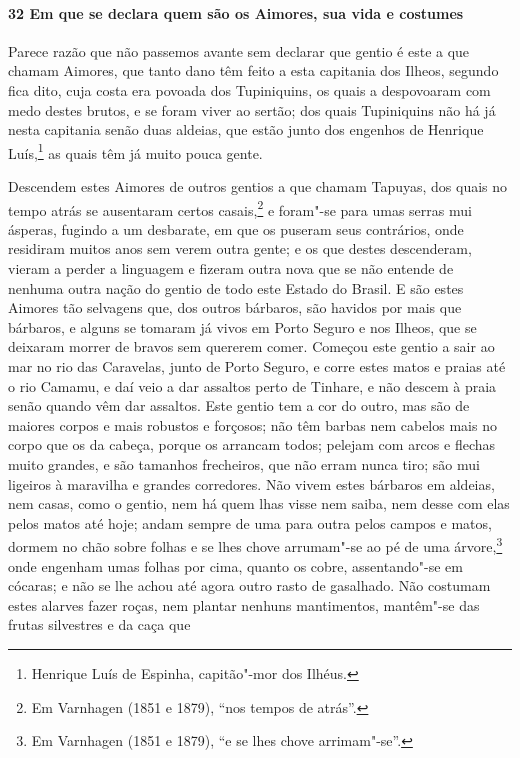 \begin{linenumbers}
\paragraph{32 Em que se declara quem são os Aimores, sua vida e costumes} \quad
Parece razão que não passemos avante sem declarar que gentio é este a que chamam Aimores,
que tanto dano têm feito a esta capitania dos Ilheos, segundo fica dito, cuja costa era
povoada dos Tupiniquins, os quais a despovoaram com medo destes brutos, e se foram viver
ao sertão; dos quais Tupiniquins não há já nesta capitania senão duas aldeias, que estão
junto dos engenhos de Henrique Luís,\footnote{ Henrique Luís de Espinha, capitão"-mor dos
Ilhéus.} as quais têm já muito pouca gente.

Descendem estes Aimores de outros gentios a que chamam Tapuyas, dos quais no tempo atrás
se ausentaram certos casais,\footnote{ Em Varnhagen (1851 e 1879), ``nos tempos de
atrás''.} e foram"-se para umas serras mui ásperas, fugindo a um desbarate, em que os
puseram seus contrários, onde residiram muitos anos sem verem outra gente; e os que destes
descenderam, vieram a perder a linguagem e fizeram outra nova que se não entende de
nenhuma outra nação do gentio de todo este Estado do Brasil. E são estes Aimores tão
selvagens que, dos outros bárbaros, são havidos por mais que bárbaros, e alguns se tomaram
já vivos em Porto Seguro e nos Ilheos, que se deixaram morrer de bravos sem quererem
comer. Começou este gentio a sair ao mar no rio das Caravelas, junto de Porto Seguro, e
corre estes matos e praias até o rio Camamu, e daí veio a dar assaltos perto de Tinhare, e
não descem à praia senão quando vêm dar assaltos. Este gentio tem a cor do outro, mas são
de maiores corpos e mais robustos e forçosos; não têm barbas nem cabelos mais no corpo que
os da cabeça, porque os arrancam todos; pelejam com arcos e flechas muito grandes, e são
tamanhos frecheiros, que não erram nunca tiro; são mui ligeiros à maravilha e grandes
corredores. Não vivem estes bárbaros em aldeias, nem casas, como o gentio, nem há quem
lhas visse nem saiba, nem desse com elas pelos matos até hoje; andam sempre de uma para
outra pelos campos e matos, dormem no chão sobre folhas e se lhes chove arrumam"-se ao pé
de uma árvore,\footnote{ Em Varnhagen (1851 e 1879), ``e se lhes chove arrimam"-se''.} onde
engenham umas folhas por cima, quanto os cobre, assentando"-se em cócaras; e não se lhe
achou até agora outro rasto de gasalhado. Não costumam estes alarves fazer roças, nem
plantar nenhuns mantimentos, mantêm"-se das frutas silvestres e da caça que

\end{linenumbers}
